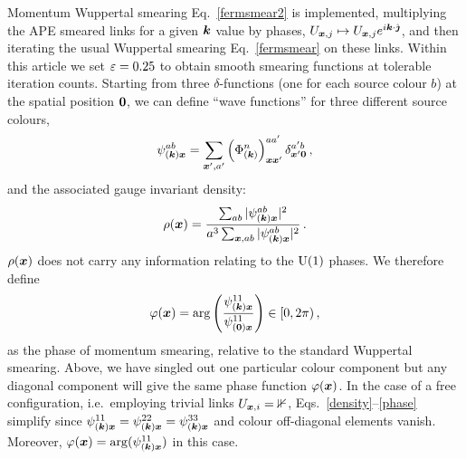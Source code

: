 Momentum Wuppertal smearing
Eq.~\eqref{fermsmear2} is implemented, multiplying the APE smeared links
for a given $\boldsymbol{k}$ value by phases,
$U_{\boldsymbol{x},j}\mapsto U_{\boldsymbol{x},j}e^{i\boldsymbol{k}\cdot\hat{\boldsymbol{\jmath}}}$,
and then iterating the usual Wuppertal smearing
Eq.~\eqref{fermsmear} on these links. Within this article we set $\varepsilon=0.25$
to obtain smooth smearing functions at tolerable iteration counts.
Starting from three $\delta$-functions (one for each source colour $b$) at
the spatial position $\boldsymbol{0}$, we can define ``wave functions'' for
three different source colours,
\begin{equation}
\psi_{(\boldsymbol{k})\boldsymbol{x}}^{ab}=\sum_{\boldsymbol{x}',a'}\left(\Phi_{(\boldsymbol{k})}^n\right)_{\boldsymbol{x}\boldsymbol{x}'}^{aa'}\delta_{\boldsymbol{x}'\boldsymbol{0}}^{a'b}\,,
\end{equation}
and the associated gauge invariant density:
\begin{equation}
\label{density}
\rho(\boldsymbol{x})=\frac{\sum_{ab}|\psi_{(\boldsymbol{k})\boldsymbol{x}}^{ab}|^2}
{a^3\sum_{\boldsymbol{x},ab}|\psi_{(\boldsymbol{k})\boldsymbol{x}}^{ab}|^2}\,.
\end{equation}
$\rho(\boldsymbol{x})$ does not carry any information relating to the
$\textmd{U}(1)$ phases. We therefore define
\begin{equation}
\label{phase}
\varphi(\boldsymbol{x})=\arg\left(\frac{\psi_{(\boldsymbol{k})\boldsymbol{x}}^{11}}{
\psi_{(\boldsymbol{0})\boldsymbol{x}}^{11}}\right)\in[0,2\pi)\,,
\end{equation}
as the phase of momentum smearing,
relative to the standard Wuppertal smearing. Above, we have singled
out one particular colour component but any diagonal component
will give the same phase function $\varphi(\boldsymbol{x})$.
In the case of a free configuration, i.e.\ employing trivial
links $U_{\boldsymbol{x},i}=\mathbb{1}$, Eqs.~\eqref{density}--\eqref{phase}
simplify since $\psi_{(\boldsymbol{k})\boldsymbol{x}}^{11}=\psi_{(\boldsymbol{k})\boldsymbol{x}}^{22}
=\psi_{(\boldsymbol{k})\boldsymbol{x}}^{33}$ and colour off-diagonal elements vanish.
Moreover, $\varphi(\boldsymbol{x})=\arg(\psi_{(\boldsymbol{k})\boldsymbol{x}}^{11})$ in this case.

